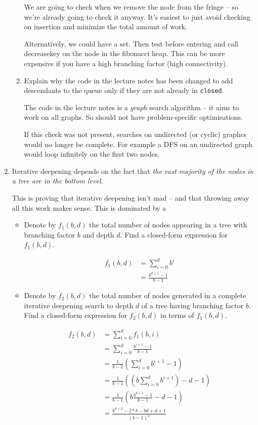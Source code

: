 \documentclass[10pt,\jkfside,a4paper]{article}
\begin{document}
\begin{enumerate}
\begin{enumerate}[label=(\alph*)]
{We are going to check when we remove the node from the fringe -- so we're
already going to check it anyway. It's easiest to just avoid checking on
insertion and minimize the total amount of work.

Alternatively, we could have a set. Then test before entering and call
decreasekey on the node in the fibonacci heap. This can be more expensive if
you have a high branching factor (high connectivity).
}

\item Explain why the code in the lecture notes has been changed to add
descendants to the queue only if they are not already in \texttt{closed}.

The code in the lecture notes is a \textit{graph} search algorithm -- it
aims to work on all graphs. So should not have problem-specific
optimisations.

If this check was not present, searches on undirected (or cyclic) graphcs
would no longer be complete. For example a DFS on an undirected graph would
loop infinitely on the first two nodes.

\end{enumerate}

\item Iterative deepening depends on the fact that \textit{the vast majority of
the nodes in a tree are in the bottom level}.

{\color{blue}
This is proving that iterative deepening isn't mad
-- and that throwing away all this work makes sense. This is dominated by a
}

\begin{itemize}

\item Denote by $f_1(b, d)$ the total number of nodes appearing in a tree
with branching factor $b$ and depth $d$. Find a closed-form expression for
$f_1(b, d)$.

\[
\begin{split}
f_1(b, d)
&= \sum^d_{i=0} b^i \\
&= \frac{b^{d + 1} - 1}{b - 1}
\end{split}
\]

\item Denote by $f_2(b, d)$ the total number of nodes generated in a
complete iterative deepening search to depth $d$ of a tree having branching
factor $b$. Find a closed-form expression for $f_2(b, d)$ in terms of
$f_1(b, d)$.

\[
\begin{split}
f_2(b, d)
&= \sum^{d}_{i=0} f_1(b, i) \\
&= \sum^{d}_{i=0} \frac{b^{i + 1} - 1}{b - 1} \\
&= \frac{1}{b - 1} \left( \sum^{d}_{i=0} b^{i+1} - 1 \right) \\
&= \frac{1}{b - 1} \left(\left(b\sum^{d}_{i=0} b^{i+1}\right) - d - 1\right) \\
&= \frac{1}{b-1}\left( b\frac{b^{d + 1} - 1}{b - 1} - d - 1\right) \\
&= \frac{b^{d + 2} - 2 * b - bd + d + 1}{(b - 1)^2}
\end{split}
\]


\end{itemize}
\end{enumerate}
\end{document}
